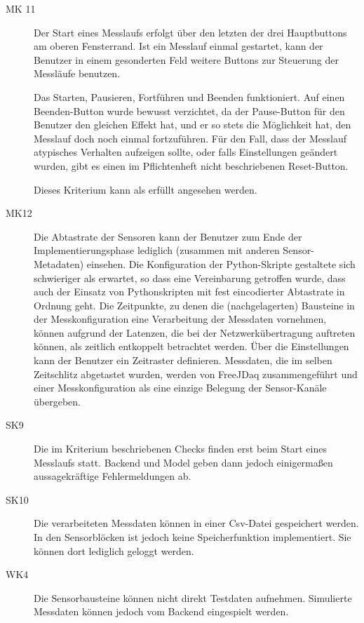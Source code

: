 \documentclass[parskip=full]{scrartcl}
\begin{document}
\begin{description}
\item[MK 11] Der Start eines Messlaufs erfolgt über den letzten der drei Hauptbuttons am oberen Fensterrand. Ist ein Messlauf einmal gestartet, kann der Benutzer in einem gesonderten Feld weitere Buttons zur Steuerung der Messläufe benutzen.  

Das Starten, Pausieren, Fortführen und Beenden funktioniert. Auf einen Beenden-Button wurde bewusst verzichtet, da der Pause-Button für den Benutzer den gleichen Effekt hat, und er so stets die Möglichkeit hat, den Messlauf doch noch einmal fortzuführen. Für den Fall, dass der Messlauf atypisches Verhalten aufzeigen sollte, oder falls Einstellungen geändert wurden, gibt es einen im Pflichtenheft nicht beschriebenen Reset-Button. 

Dieses Kriterium kann als erfüllt angesehen werden.

\item[MK12]
Die Abtastrate der Sensoren kann der Benutzer zum Ende der Implementierungsphase lediglich (zusammen mit anderen Sensor-Metadaten) einsehen. Die Konfiguration der Python-Skripte gestaltete sich schwieriger als erwartet, so dass eine Vereinbarung getroffen wurde, dass auch der Einsatz von Pythonskripten mit fest eincodierter Abtastrate in Ordnung geht. Die Zeitpunkte, zu denen die (nachgelagerten) Bausteine in der Messkonfiguration eine Verarbeitung der Messdaten vornehmen, können aufgrund der Latenzen, die bei der Netzwerkübertragung auftreten können, als zeitlich entkoppelt betrachtet werden. Über die Einstellungen kann der Benutzer ein Zeitraster definieren. Messdaten, die im selben Zeitschlitz abgetastet wurden, werden von FreeJDaq zusammengeführt und einer Messkonfiguration als eine einzige Belegung der Sensor-Kanäle übergeben.
\item[SK9]
Die im Kriterium beschriebenen Checks finden erst beim Start eines Messlaufs statt. Backend und Model geben dann jedoch einigermaßen aussagekräftige Fehlermeldungen ab. 
\item[SK10]
Die verarbeiteten Messdaten können in einer Csv-Datei gespeichert werden. In den  Sensorblöcken ist jedoch keine Speicherfunktion implementiert. Sie können dort lediglich geloggt werden. 
\item[WK4]
Die Sensorbausteine können nicht direkt Testdaten aufnehmen. Simulierte Messdaten können jedoch vom Backend eingespielt werden. 
\end{description}
\end{document}
